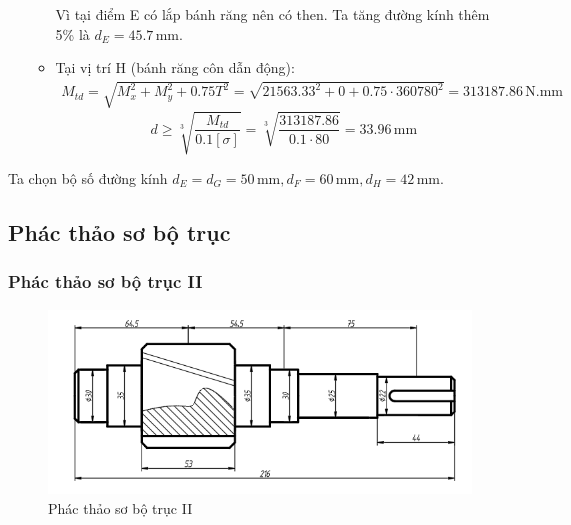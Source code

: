\begin{itemize}
\begin{itemize}
                                Vì tại điểm E có lắp bánh răng nên có then. Ta tăng đường kính thêm 5\% là $d_E = 45.7 \, \mathrm{mm}$.
                            \item Tại vị trí H (bánh răng côn dẫn động):
                                \begin{align*}
                                    M_{td} = \sqrt{M_{x}^2 + M_{y}^2 +  0.75T^2} = \sqrt{21563.33^2 + 0 + 0.75 \cdot 360780^2} = 313187.86 \, \mathrm{N.mm}
                                \end{align*}
                                \[
                                    d \geq \sqrt[3]{\frac{M_{td}}{0.1 [\sigma]}} = \sqrt[3]{\frac{313187.86}{0.1 \cdot 80}} = 33.96 \, \mathrm{mm}
                                \]
                        \end{itemize}
                \end{itemize}
            Ta chọn bộ số đường kính $d_E = d_G = 50 \, \mathrm{mm}, d_F = 60 \, \mathrm{mm}, d_H = 42 \, \mathrm{mm}$.             
        \subsection{Phác thảo sơ bộ trục}
            \subsubsection{Phác thảo sơ bộ trục II}
                \begin{figure}[H]
                    \centering
                    \includegraphics[width=1\textwidth]{pictures/shaft_II.png}
                    \caption{Phác thảo sơ bộ trục II}
                    \label{fig:shaft_II}
                \end{figure}
